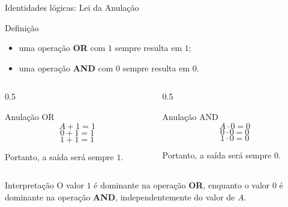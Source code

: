 
\begin{frame}{Identidades lógicas: Lei da Anulação}
    \begin{block}{Definição}
        \begin{itemize}
            \item uma operação \textbf{OR} com $1$ sempre resulta em $1$;
            \item uma operação \textbf{AND} com $0$ sempre resulta em $0$.
        \end{itemize}
    \end{block}

    \vspace{0.3cm}

    \begin{columns}[T]

        \begin{column}{0.5\textwidth}
            \begin{block}{Anulação OR}
                \[
                    \boxed{A + 1 = 1}
                \]
                \[
                    0 + 1 = 1
                \]
                \[
                    1 + 1 = 1
                \]

                Portanto, a saída será sempre $1$.
            \end{block}
        \end{column}

        \begin{column}{0.5\textwidth}
            \begin{block}{Anulação AND}
                \[
                    \boxed{A \cdot 0 = 0}
                \]
                \[
                    0 \cdot 0 = 0
                \]
                \[
                    1 \cdot 0 = 0
                \]

                Portanto, a saída será sempre $0$.
            \end{block}
        \end{column}

    \end{columns}


    \begin{alertblock}{Interpretação}
        O valor $1$ é dominante na operação \textbf{OR}, enquanto
        o valor $0$ é dominante na operação \textbf{AND},
        independentemente do valor de $A$.
    \end{alertblock}
    
\end{frame}